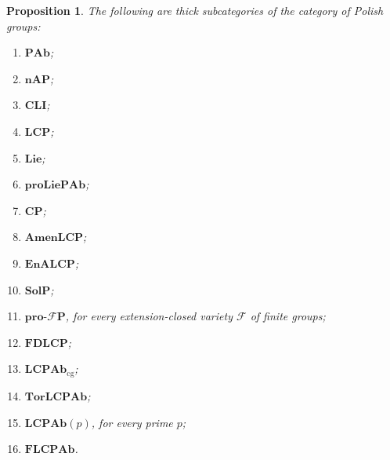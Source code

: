 \documentclass[12pt]{amsart}
\newtheorem{proposition}[theorem]{Proposition}
\theoremstyle{definition}
\begin{document}
\begin{proposition}
The following are \emph{thick subcategories} of the category of Polish
groups:

\begin{enumerate}
\item $\mathbf{PAb}$;

\item $\mathbf{nAP}$;

\item $\mathbf{CLI}$;

\item $\mathbf{LCP}$;

\item $\mathbf{Lie}$;

\item $\mathbf{proLiePAb}$;

\item $\mathbf{CP}$;

\item $\mathbf{AmenLCP}$;

\item $\mathbf{EnALCP}$;

\item $\mathbf{SolP}$;

\item $\mathbf{pro\text{-}\mathcal{F}P}$, for every extension-closed variety 
$\mathcal{F}$ of finite groups;

\item $\mathbf{FDLCP}$;

\item $\mathbf{LCPAb}_{\mathrm{cg}}$;

\item $\mathbf{TorLCPAb}$;

\item $\mathbf{LCPAb}(p)$, for every prime $p$;

\item $\mathbf{FLCPAb}$.
\end{enumerate}
\end{proposition}
\end{document}
